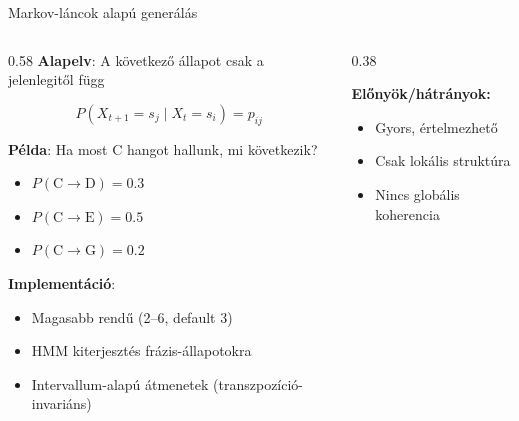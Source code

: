 \documentclass[aspectratio=169]{beamer}
\begin{document}
\begin{frame}{Markov-láncok alapú generálás}
\begin{columns}[T]
\begin{column}{0.58\textwidth}
\textbf{Alapelv}: A következő állapot csak a jelenlegitől függ

\[
P(X_{t+1} = s_j \mid X_t = s_i) = p_{ij}
\]

\textbf{Példa}: Ha most C hangot hallunk, mi következik?
\begin{itemize}
    \item $P(\text{C} \to \text{D}) = 0.3$
    \item $P(\text{C} \to \text{E}) = 0.5$
    \item $P(\text{C} \to \text{G}) = 0.2$
\end{itemize}

\textbf{Implementáció}:
\begin{itemize}
    \item Magasabb rendű (2--6, default 3)
    \item HMM kiterjesztés frázis-állapotokra
    \item Intervallum-alapú átmenetek (transzpozíció-invariáns)
\end{itemize}
\end{column}

\begin{column}{0.38\textwidth}
\vspace{0.5em}
\begin{center}
\end{center}

\vspace{0.5em}
\textbf{Előnyök/hátrányok:}
\begin{itemize}
    \item[\textcolor{green}{+}] Gyors, értelmezhető
    \item[\textcolor{red}{-}] Csak lokális struktúra
    \item[\textcolor{red}{-}] Nincs globális koherencia
\end{itemize}
\end{column}
\end{columns}
\end{frame}
\end{document}
